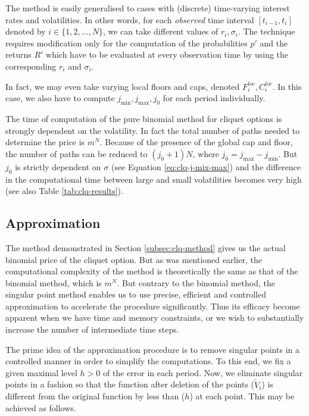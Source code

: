 \begin{rem}[Generalisation]
	The method is easily generalised to cases with (discrete) time-varying interest rates and volatilities. In other words, for each \emph{observed} time interval $ [t_{i-1}, t_{i}] $ denoted by $ i \in \{1, 2, \dots, N \} $, we can take different values of $ r_i, \sigma_i $. The technique requires modification only for the computation of the probabilities $ p' $ and the returns $ R' $ which have to be evaluated at every observation time by using the corresponding $ r_i $ and $ \sigma_i $.
	
	In fact, we may even take varying local floors and caps, denoted $ F_i^{loc}, C_i^{loc} $. In this case, we also have to compute $ j_{\min}, j_{\max}, j_0 $ for each period individually.
\end{rem}


\begin{rem}
	The time of computation of the pure binomial method for cliquet options is strongly dependent on the volatility. In fact the total number of paths needed to determine the price is $ m^N $. Because of the presence of the global cap and floor, the number of paths can be reduced to $ ( j_0 + 1 ) N $, where $ j_0 = j_{\max} - j_{\min} $. But $ j_0 $ is strictly dependent on $ \sigma $ (see Equation \ref{eq:clq-j-mix-max}) and the difference in the computational time between large and small volatilities becomes very high (see also Table \ref{tab:clq-results}).
\end{rem}



\subsection{Approximation}
\label{subsec:clq-approx}

The method demonstrated in Section \ref{subsec:clq-method} gives us the actual binomial price of the cliquet option. But as was mentioned earlier, the computational complexity of the method is theoretically the same as that of the binomial method, which is $ m^N $. But contrary to the binomial method, the singular point method enables us to use precise, efficient and controlled approximation to accelerate the procedure significantly. Thus its efficacy become apparent when we have time and memory constraints, or we wish to substantially increase the number of intermediate time steps.

The prime idea of the approximation procedure is to remove singular points in a controlled manner in order to simplify the computations. To this end, we fix a given maximal level $ h > 0 $ of the error in each period. Now, we eliminate singular points in a fashion so that the function after deletion of the points ($ \tilde{V}_i $) is different from the original function by less than ($ h $) at each point. This may be achieved as follows.

